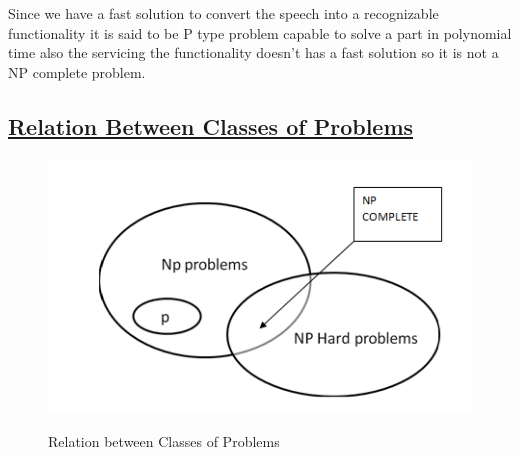 \noindent
\hspace{3em}Since we have a fast solution to convert the speech into a recognizable functionality it is said to be P type problem capable to solve a part in polynomial time also the servicing the functionality doesn't has a fast solution so it  is not a NP complete problem.
\subsection*{\underline{Relation Between Classes of Problems}}
 \begin{figure}[H]
    \centering
  \includegraphics[scale=0.9]{nprelation.PNG}\\
  \caption{Relation between Classes of Problems}

\end{figure}
